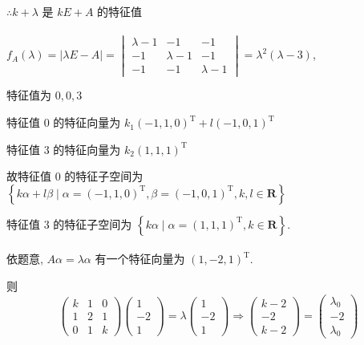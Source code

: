          \( \therefore k + \lambda \) 是 \( kE + A \) 的特征值


     \paragraph{} %
         \( f_{A}(\lambda) = |\lambda E - A| = \begin{vmatrix}
             \lambda - 1 & -1          & -1          \\
             -1          & \lambda - 1 & -1          \\
             -1          & -1          & \lambda - 1
         \end{vmatrix} = \lambda^{2}(\lambda - 3) \),

         特征值为 \( 0, 0, 3 \)

         特征值 \( 0 \) 的特征向量为 \( k_{1}(-1, 1, 0)^{\mathrm{T}} + l(-1, 0, 1)^{\mathrm{T}} \)

         特征值 \( 3 \) 的特征向量为 \( k_{2}(1, 1, 1)^{\mathrm{T}} \)

         故特征值 \( 0 \) 的特征子空间为 \( \left\{ k\alpha + l\beta \mid \alpha = (-1, 1, 0)^{\mathrm{T}}, \beta = (-1, 0, 1)^{\mathrm{T}}, k, l \in \mathbf{R} \right\} \)

         特征值 \( 3 \) 的特征子空间为 \( \left\{ k\alpha \mid \alpha = (1, 1, 1)^{\mathrm{T}}, k \in \mathbf{R} \right\} \).

     \paragraph{} %
         依题意, \( A\alpha = \lambda\alpha \) 有一个特征向量为 \( (1, -2, 1)^{\mathrm{T}} \).

         则 \[ \begin{pmatrix}
                 k & 1 & 0 \\
                 1 & 2 & 1 \\
                 0 & 1 & k
             \end{pmatrix}\begin{pmatrix}
                 1  \\
                 -2 \\
                 1
             \end{pmatrix} = \lambda\begin{pmatrix}
                 1  \\
                 -2 \\
                 1
             \end{pmatrix} \Rightarrow \begin{pmatrix}
                 k - 2 \\
                 -2    \\
                 k - 2
             \end{pmatrix} = \begin{pmatrix}
                 \lambda_0 \\
                 -2        \\
                 \lambda_0
             \end{pmatrix} \]

